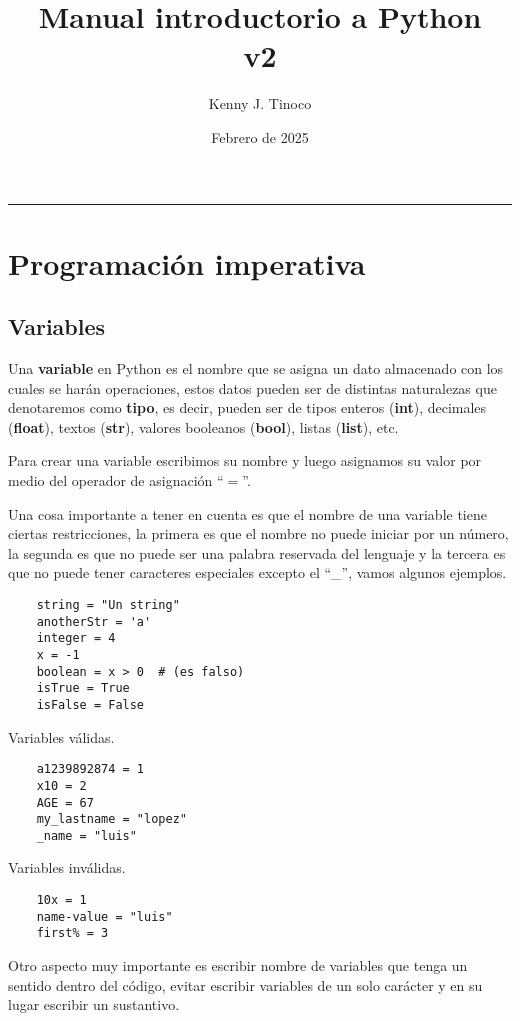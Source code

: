 \documentclass[12pt]{article}
\title{Manual introductorio a Python\\v2}
\author{Kenny J. Tinoco}
\date{Febrero de 2025}
\theoremstyle{definition}
\begin{document}
    \maketitle

    \tableofcontents

    \vspace{5mm}
    \hrule

    \section{Programación imperativa}

    \subsection{Variables}
    Una \textbf{variable} en Python es el nombre que se asigna un dato almacenado con los cuales se harán operaciones,
    estos datos pueden ser de distintas naturalezas que denotaremos como \textbf{tipo}, es decir, pueden ser de tipos
    enteros (\textbf{int}), decimales (\textbf{float}), textos (\textbf{str}), valores booleanos (\textbf{bool}), listas (\textbf{list}), etc.

    Para crear una variable escribimos su nombre y luego asignamos su valor por medio del operador de asignación ``$=$''.

    Una cosa importante a tener en cuenta es que el nombre de una variable tiene ciertas restricciones, la primera es
    que el nombre no puede iniciar por un número, la segunda es que no puede ser una palabra reservada del lenguaje y
    la tercera es que no puede tener caracteres especiales excepto el ``\_'', vamos algunos ejemplos.
    \begin{lstlisting}
    string = "Un string"
    anotherStr = 'a'
    integer = 4
    x = -1
    boolean = x > 0  # (es falso)
    isTrue = True
    isFalse = False
    \end{lstlisting}

    Variables válidas.
    \begin{lstlisting}
    a1239892874 = 1
    x10 = 2
    AGE = 67
    my_lastname = "lopez"
    _name = "luis"
    \end{lstlisting}

    Variables inválidas.
    \begin{lstlisting}
    10x = 1
    name-value = "luis"
    first% = 3
    \end{lstlisting}

    Otro aspecto muy importante es escribir nombre de variables que tenga un sentido dentro del código, evitar escribir
    variables de un solo carácter y en su lugar escribir un sustantivo.
\end{document}
